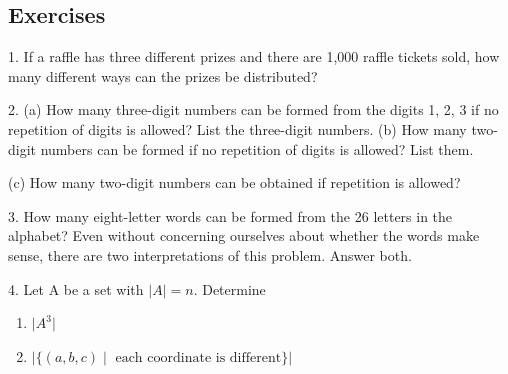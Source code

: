 \documentclass[10pt,]{book}
\theoremstyle{plain}
\theoremstyle{definition}
\begin{document}
\typeout{************************************************}
\typeout{************************************************}
\subsection[Exercises]{Exercises}\label{exercises-7}
\hypertarget{exercisegroup-12}{}\begin{exercisegroup}
\item[1.]\hypertarget{exercise-62}{} If a raffle has three different prizes and there are 1,000 raffle tickets sold, how many different ways can the prizes be distributed?\par\smallskip
\item[2.]\hypertarget{exercise-63}{} (a) How many three-digit numbers can be formed from the digits 1, 2, 3 if no repetition of digits is allowed? List the three-digit numbers.
 (b) How many two-digit numbers can be formed if no repetition of digits is allowed? List them.%
\par
 (c) How many two-digit numbers can be obtained if repetition is allowed?%
\par\smallskip
\item[3.]\hypertarget{exercise-64}{} How many eight-letter words can be formed from the 26 letters in the alphabet? Even without concerning ourselves about whether the words make sense, there are two interpretations of this problem. Answer both.\par\smallskip
\item[4.]\hypertarget{exercise-65}{} Let A be a set with \( \lvert A \rvert = n \).
Determine 
\leavevmode%
\begin{enumerate}[label=(\alph*)]
\item\hypertarget{li-212}{}\( \lvert A^3 \rvert \)\item\hypertarget{li-213}{}\( \lvert \{ ( a, b, c) \mid \textrm{ each coordinate is different} \} \rvert \)\end{enumerate}


\end{exercisegroup}
\end{document}
